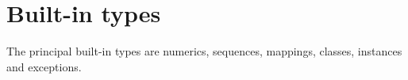 \section{Built-in types}
The principal built-in types are numerics, sequences, mappings, classes, instances and exceptions.









%